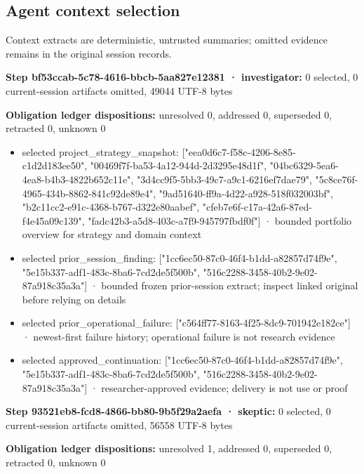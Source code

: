 \documentclass[11pt]{article}
\begin{document}
\subsection{Agent context selection}
Context extracts are deterministic, untrusted summaries; omitted evidence remains in the original session records.\par
\textbf{Step bf53ccab-5c78-4616-bbcb-5aa827e12381 · investigator:} 0 selected, 0 current-session artifacts omitted, 49044 UTF-8 bytes\par
\textbf{Obligation ledger dispositions:} unresolved 0, addressed 0, superseded 0, retracted 0, unknown 0\par
\begin{itemize}
\item selected project\_strategy\_snapshot: ["eea0d6c7-f58c-4206-8e85-c1d2d183ee50", "00469f7f-ba53-4a12-944d-2d3295e48d1f", "04bc6329-5ea6-4ea8-b4b3-4822b652c11e", "3d4cc9f5-5bb3-49c7-a9c1-6216ef7dae79", "5c8ce76f-4965-434b-8862-841c92de89e4", "9ad51640-ff9a-4d22-a928-518f032003bf", "b2c11cc2-e91c-4368-b767-d322e80aabef", "cfeb7e6f-c17a-42a6-87ed-f4e45a09c139", "fadc42b3-a5d8-403c-a7f9-945797fbdf0f"] · bounded portfolio overview for strategy and domain context
\item selected prior\_session\_finding: ["1cc6ec50-87c0-46f4-b1dd-a82857d74f9e", "5e15b337-adf1-483c-8ba6-7cd2de5f500b", "516c2288-3458-40b2-9e02-87a918c35a3a"] · bounded frozen prior-session extract; inspect linked original before relying on details
\item selected prior\_operational\_failure: ["c564ff77-8163-4f25-8dc9-701942e182ce"] · newest-first failure history; operational failure is not research evidence
\item selected approved\_continuation: ["1cc6ec50-87c0-46f4-b1dd-a82857d74f9e", "5e15b337-adf1-483c-8ba6-7cd2de5f500b", "516c2288-3458-40b2-9e02-87a918c35a3a"] · researcher-approved evidence; delivery is not use or proof
\end{itemize}
\textbf{Step 93521eb8-fcd8-4866-bb80-9b5f29a2aefa · skeptic:} 0 selected, 0 current-session artifacts omitted, 56558 UTF-8 bytes\par
\textbf{Obligation ledger dispositions:} unresolved 1, addressed 0, superseded 0, retracted 0, unknown 0\par
\end{document}

